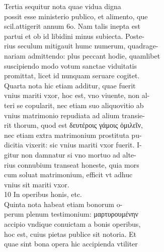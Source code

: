 \documentclass{article}
\begin{document}
\begin{pages}
                Tertia sequitur nota quae vidua digna \\
                possit esse ministerio publico, et alimento, que \\
                scil.attigerit annum 6o. Nam talis inepta est \\
                partui et ob id libidini minus subiecta. Poste- \\
                rius seculum mitigauit humc numerum, quadrage- \\
                nariam admittendo: plus peccant hodie, quamlibet \\
                suscipiendo modo votum sanctae viduitatis \\
                promittat, licet id nunquam seruare cogitet. \\
                Quarta nota hic etiam additur, quae fuerit \\
                vnius mariti vxor, hoc est, vno viuente, non al- \\
                teri se copularit, nec etiam suo aliquovitio ab \\
                vnius matrimonio repudiata ad alium transie- \\
                rit thorum, quod est δευτέροις γάμοις ὁμιλεῖν, \\
                nec etiam extra matrimonium prostituta pu- \\
                dicitia vixerit: sic vnius mariti vxor fuerit. I- \\
                gitur non damnatur si vno mortuo ad alte- \\
                rius connubium transeat honeste, quia mors \\
                cum soluat matrimonium, efficit vt adhuc \\
                vnius sit mariti vxor. \\
                10 In operibus honis, etc. \\
                Quinta nota habeat etiam bonorum o- \\
                perum plenum testimonium: μαρτυρουμένην \\
                accipio vndique conuictam a bonis operibus, \\
                hoc est, cuius pietas publice sit notoria. Et \\
                quae sint bona opera hic accipienda vtiliter \\

\end{pages}
\end{document}
